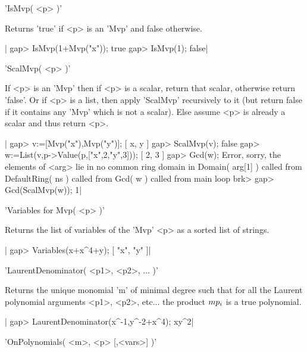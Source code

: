 %
%

'IsMvp( <p> )'

Returns 'true' if <p> is an 'Mvp' and false otherwise.

|    gap> IsMvp(1+Mvp("x"));
    true
    gap> IsMvp(1);         
    false|

%
%

'ScalMvp( <p> )'

If  <p> is  an  'Mvp' then  if  <p>  is a  scalar,  return that  scalar,
otherwise return  'false'. Or  if <p>  is a  list, then  apply 'ScalMvp'
recursively to  it (but return false  if it contains any  'Mvp' which is
not a scalar). Else assume <p> is already a scalar and thus return <p>.

|    gap> v:=[Mvp("x"),Mvp("y")];        
    [ x, y ]
    gap> ScalMvp(v);
    false
    gap> w:=List(v,p->Value(p,["x",2,"y",3]));
    [ 2, 3 ]
    gap> Gcd(w);
    Error, sorry, the elements of <arg> lie in no common ring domain in
    Domain( arg[1] ) called from
    DefaultRing( ns ) called from
    Gcd( w ) called from
    main loop
    brk> 
    gap> Gcd(ScalMvp(w));
    1|

%
%

'Variables for Mvp( <p> )'

Returns the list of variables of the 'Mvp' <p> as a sorted list of strings.

|    gap> Variables(x+x^4+y);
    [ "x", "y" ]|

%
%

'LaurentDenominator( <p1>, <p2>, ... )'

Returns the unique monomial 'm' of minimal degree such that for all the
Laurent polynomial arguments <p1>, <p2>, etc... the product $m\* p_i$ is
a true polynomial.

|    gap> LaurentDenominator(x^-1,y^-2+x^4);
    xy^2|

%
%

'OnPolynomials( <m>, <p> [,<vars>] )'

